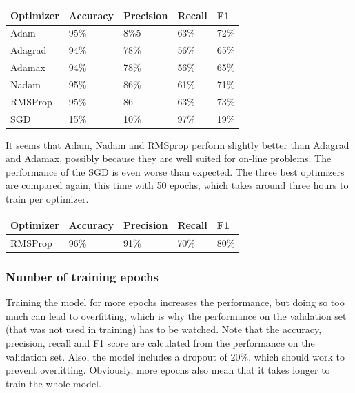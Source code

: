 \documentclass[
	a4paper,
	pagesize,
	pdftex,
	12pt,
	twoside, %
	BCOR=5mm, %
	ngerman,
	fleqn,
	final,
	]{scrartcl}
\begin{document}
\begin{tabular}{ | p{3cm} || p{2cm}|p{2cm}|p{2cm}|p{2cm}|  }
	\hline
	\textbf{Optimizer} & \textbf{Accuracy} & \textbf{Precision} & \textbf{Recall} & \textbf{F1} \\
	\hline
	Adam & 95\% &  8\%5 &  63\% &  72\% \\  
	Adagrad & 94\% &  78\% &  56\% &  65\% \\ 
	Adamax & 94\% &  78\% &  56\% &  65\% \\ 
	Nadam & 95\% &  86\% &  61\% &  71\% \\ 
	RMSProp & 95\% &  86 &  63\% &  73\% \\ 
	SGD & 15\% &  10\% &  97\% & 19\% \\
	\hline
	\hline
\end{tabular}

It seems that Adam, Nadam and RMSprop perform slightly better than Adagrad and Adamax, possibly because they are well suited for on-line problems. The performance of the SGD is even worse than expected. The three best optimizers are compared again, this time with 50 epochs, which takes around three hours to train per optimizer.

\begin{tabular}{ | p{3cm} || p{2cm}|p{2cm}|p{2cm}|p{2cm}|  }
	\hline
	\textbf{Optimizer} & \textbf{Accuracy} & \textbf{Precision} & \textbf{Recall} & \textbf{F1} \\
	\hline
	RMSProp & 96\% &  91\% &  70\% &  80\% \\ 
	\hline
	\hline
\end{tabular}



\subsubsection{Number of training epochs}

Training the model for more epochs increases the performance, but doing so too much can lead to overfitting, which is why the performance on the validation set (that was not used in training) has to be watched. Note that the accuracy, precision, recall and F1 score are calculated from the performance on the validation set. Also, the model includes a dropout of 20\%, which should work to prevent overfitting. Obviously, more epochs also mean that it takes longer to train the whole model.
\end{document}
